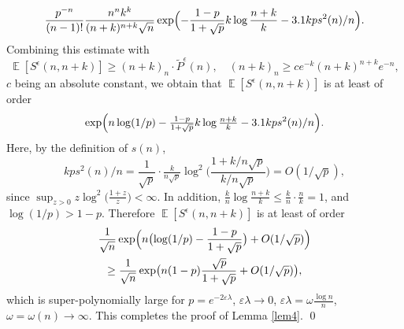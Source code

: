\documentclass[10pt,a4paper]{amsart}
\newcommand{\E}{\operatorname{\mathbb{E}}}
\def\eps{\varepsilon}
\newenvironment{proof}{\noindent{\bf Proof:}}{\qed}
\begin{document}
\begin{proof}
\begin{equation*}
\frac{p^{-n}}{(n-1)!}\frac{n^n k^k}{(n+k)^{n+k}\sqrt{n}}\exp\Bigl(-\frac{1-p}{1+\sqrt{p}}k\log\frac{n+k}{k}-3.1kps^2(n)/n\Bigr).
\end{equation*}
Combining this estimate with 
\begin{equation*}
\E[S^\epsilon (n,n+k)] 
\geq (n+k)_n \cdot \tilde{P}^\epsilon(n),\quad (n+k)_n\ge c e^{-k}(n+k)^{n+k} e^{-n},
\end{equation*}
$c$ being an absolute constant, we obtain that $\E[S^\epsilon (n,n+k)]$ is at least of order
\begin{equation*} 
\exp\Bigl(n\log(1/p)-\tfrac{1-p}{1+\sqrt{p}}k\log\tfrac{n+k}{k}-3.1kps^2(n)/n\Bigr).
\end{equation*}
Here, by the definition of $s(n)$,
\begin{equation*}
kps^2(n)/n=\frac{1}{\sqrt{p}}\cdot\tfrac{k}{n\sqrt{p}}\log^2\bigl(\frac{1+k/n\sqrt{p}}{k/n\sqrt{p}}\bigr)=O(1/\sqrt{p}),
\end{equation*}
since $\sup_{z>0} z\log^2\bigl(\frac{1+z}{z}\bigr)<\infty$.  In addition, $\frac{k}{n}\log\tfrac{n+k}{k}\le \frac{k}{n}\cdot \tfrac{n}{k}=1$, and $\log(1/p)>1-p$. Therefore $\E[S^\epsilon (n,n+k)]$ is at least of order
\begin{multline*}
\frac{1}{\sqrt{n}}\exp\Bigl(n\bigl(\log(1/p)-\frac{1-p}{1+\sqrt{p}}\bigr)+O(1/\sqrt{p})\Bigr)\\
\ge\frac{1}{\sqrt{n}} \exp\bigl(n(1-p)\frac{\sqrt{p}}{1+\sqrt{p}}+O(1/\sqrt{p})\bigr),
\end{multline*}
which is super-polynomially large for $p=e^{-2\eps\lambda}$, $\eps\lambda\to 0$, $\eps\lambda=\omega \tfrac{\log n}{n}$, $\omega=\omega(n)\to\infty$. This completes the proof of Lemma \ref{lem4}.
\end{proof}
\end{document}
